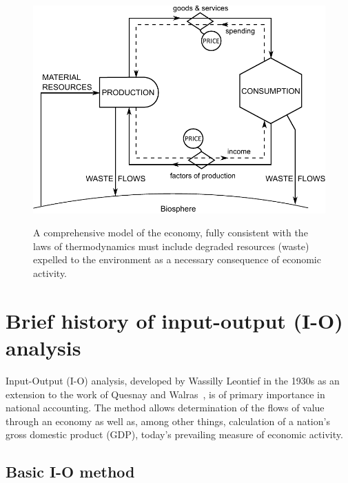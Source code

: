 \begin{figure}[!ht]
\centering\
\includegraphics[width=\linewidth]{Part_0/Chapter_Introduction/images/PERKS.pdf}
\caption[A comprehensive biophysical model of the economy]{A comprehensive model 
of the economy, fully consistent with the laws of thermodynamics 
must include degraded resources (waste) expelled 
to the environment as a necessary consequence of economic activity.}
\label{fig:metabolic_economy}
\end{figure}


\section{Brief history of input-output (I-O) analysis}
\label{sec:history}

Input-Output (I-O) analysis, developed by Wassilly Leontief in the 1930s 
as an extension to the work of Quesnay and Walras~\cite{Leontief1936}, 
is of primary importance in national accounting. 
The method allows determination of the flows of value through
an economy as well as, 
among other things, 
calculation of a nation's gross domestic product (GDP), 
today's prevailing measure of economic activity.


\subsection{Basic I-O method}
\label{sec:IO_basic}

